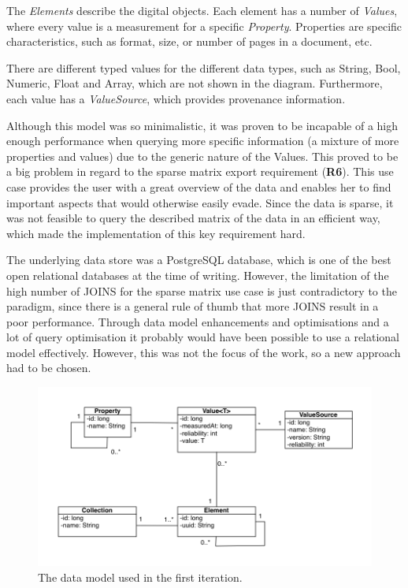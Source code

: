 The \textit{Elements} describe the digital objects. Each element has a number of \textit{Values}, where every value is a measurement for a specific \textit{Property}. Properties are specific characteristics, such as format, size, or number of pages in a document, etc. 

There are different typed values for the different data types, such as String, Bool, Numeric, Float and Array, which are not shown in the diagram. Furthermore, each value has a \textit{ValueSource}, which provides provenance information.

Although this model was so minimalistic, it was proven to be incapable of a high enough performance when querying more specific information (a mixture of more properties and values) due to the generic nature of the Values. This proved to be a big problem in regard to the sparse matrix export requirement (\textbf{R6}). This use case provides the user with a great overview of the data and enables her to find important aspects that would otherwise easily evade. Since the data is sparse, it was not feasible to query the described matrix of the data in an efficient way, which made the implementation of this key requirement hard.

The underlying data store was a PostgreSQL database, which is one of the best open relational databases at the time of writing. However, the limitation of the high number of JOINS for the sparse matrix use case is just contradictory to the paradigm, since there is a general rule of thumb that more JOINS result in a poor performance. Through data model enhancements and optimisations and a lot of query optimisation it probably would have been possible to use a relational model effectively. However, this was not the focus of the work, so a new approach had to be chosen.

\begin{figure}[t]
\begin{center}
\includegraphics[width=5in]{figures/architecture/old_datamodel.png}
\caption{The data model used in the first iteration.}
\label{fig:old_datamodel}
\end{center}
\end{figure}

